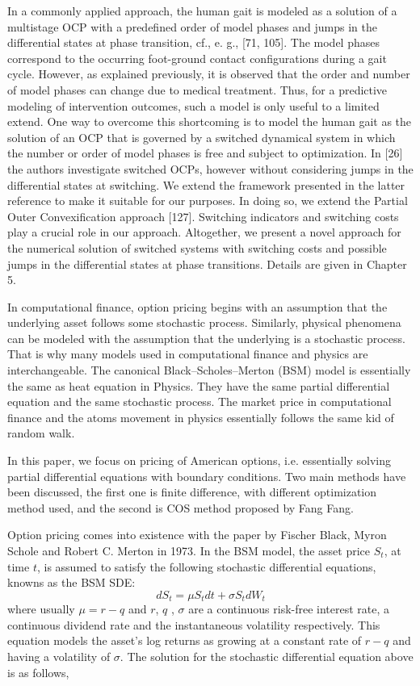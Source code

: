 In a commonly applied approach, the human gait is modeled as a solution of a multistage OCP with a predefined order of model phases and jumps in the differential
states at phase transition, cf., e. g., [71, 105]. The model phases correspond to the
occurring foot-ground contact configurations during a gait cycle. However, as explained previously, it is observed that the order and number of model phases can
change due to medical treatment. Thus, for a predictive modeling of intervention
outcomes, such a model is only useful to a limited extend. One way to overcome this
shortcoming is to model the human gait as the solution of an OCP that is governed by
a switched dynamical system in which the number or order of model phases is free
and subject to optimization. In [26] the authors investigate switched OCPs, however without considering jumps in the differential states at switching. We extend
the framework presented in the latter reference to make it suitable for our purposes.
In doing so, we extend the Partial Outer Convexification approach [127]. Switching indicators and switching costs play a crucial role in our approach. Altogether,
we present a novel approach for the numerical solution of switched systems with
switching costs and possible jumps in the differential states at phase transitions. Details are given in Chapter 5.





In computational finance, option pricing begins with an assumption that the underlying asset follows some stochastic process. Similarly, physical phenomena can be modeled with the assumption that the underlying is a stochastic process. That is why many models used in computational finance and physics are interchangeable. The canonical Black–Scholes–Merton (BSM) model is essentially the same as heat equation in Physics. They have the same partial differential equation and the same stochastic process. The market price in computational finance and the atoms movement in physics essentially follows the same kid of random walk. 


In this paper, we focus on pricing of American options, i.e. essentially solving partial differential equations with boundary conditions. Two main methods have been discussed, the first one is finite difference, with different optimization method used, and the second is COS method proposed by Fang Fang. 


Option pricing comes into existence with the paper by Fischer Black,  Myron Schole and Robert C. Merton in 1973. In the BSM model, the asset price $S_t$, at time $t$, is assumed to satisfy the following stochastic differential equations, knowns as the BSM SDE: 
\begin{equation} 
	dS_t= \mu S_tdt + \sigma S_t dW_t
	\label{BSModel}
\end{equation} 
where usually $\mu = r -q$ and $r$, $q$ , $\sigma$ are a continuous risk-free interest rate, a continuous dividend rate and the instantaneous volatility respectively. This equation models the asset’s log returns as growing at a constant rate of $r - q$ and having a volatility of $\sigma$. The solution for the stochastic differential equation above is as follows, 